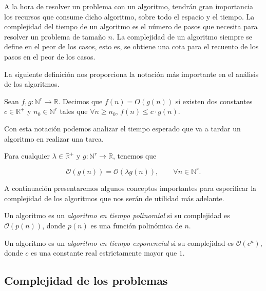 A la hora de resolver un problema con un algoritmo, tendrán gran importancia los recursos que consume dicho algoritmo, sobre todo el espacio y el tiempo. La complejidad del tiempo de un algoritmo es el número de pasos que necesita para resolver un problema de tamaño $n$. La complejidad de un algoritmo siempre se define en el peor de los casos, esto es, se obtiene una cota para el recuento de los pasos en el peor de los casos. 

La siguiente definición nos proporciona la notación más importante en el análisis de los algoritmos.

\begin{definition}
    Sean $f, g : \mathbb{N}^r \longrightarrow \mathbb{R}$. Decimos que $f(n) = O(g(n))$ si existen dos constantes $c \in \mathbb{R}^+$ y $n_0 \in \mathbb{N}^r$ tales que $\forall n \geq n_0$, $f(n) \leq c \cdot g(n)$.
\end{definition}

Con esta notación podemos analizar el tiempo esperado que va a tardar un algoritmo en realizar una tarea.

\begin{proposition}
    Para cualquier $\lambda \in \mathbb{R}^+$ y $g : \mathbb{N}^r \longrightarrow \mathbb{R}$, tenemos que

    $$\mathcal{O}(g(n)) = \mathcal{O}(\lambda g(n)), \qquad \forall n \in \mathbb{N}^r.$$
\end{proposition}

A continuación presentaremos algunos conceptos importantes para especificar la complejidad de los algoritmos que nos serán de utilidad más adelante.

\begin{definition}
    Un algoritmo es un \emph{algoritmo en tiempo polinomial} si su complejidad es $\mathcal{O}(p(n))$, donde $p(n)$ es una función polinómica de $n$.
\end{definition}

\begin{definition}
    Un algoritmo es un \emph{algoritmo en tiempo exponencial} si su complejidad es $\mathcal{O}(c^n)$, donde $c$ es una constante real estrictamente mayor que $1$.
\end{definition}

\subsection{Complejidad de los problemas}

